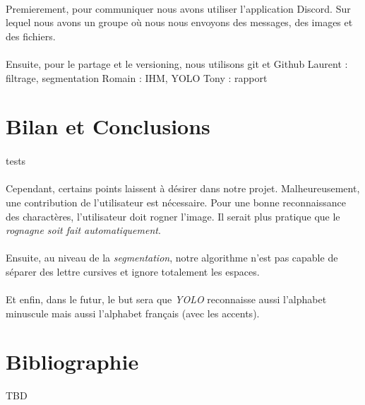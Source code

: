 \documentclass[a4paper]{article}
\begin{document}
		\paragraph{} Premierement, pour communiquer nous avons utiliser l'application Discord. Sur lequel nous avons un groupe où nous nous envoyons des messages, des images et des fichiers.
		\paragraph{} Ensuite, pour le partage et le versioning, nous utilisons git et Github
		Laurent : filtrage, segmentation
		Romain : IHM, YOLO
		Tony : rapport
	\section*{Bilan et Conclusions}%
		\paragraph{}
			tests
		\paragraph{}
			Cependant, certains points laissent à désirer dans notre projet. Malheureusement, une contribution de l'utilisateur est nécessaire. Pour une bonne reconnaissance des charactères, l'utilisateur doit rogner l'image. Il serait plus pratique que le \emph{rognagne soit fait automatiquement}. 
		\paragraph{}
			Ensuite, au niveau de la \emph{segmentation}, notre algorithme n'est pas capable de séparer des lettre cursives et ignore totalement les espaces.
		\paragraph{}
			Et enfin, dans le futur, le but sera que \emph{YOLO} reconnaisse aussi l'alphabet minuscule mais aussi l'alphabet français (avec les accents).
	\newpage
	\section*{Bibliographie}
		TBD
	\newpage
\end{document}
